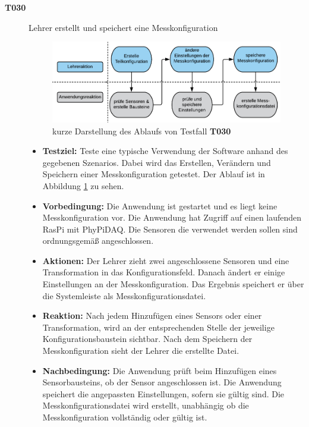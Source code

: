 \documentclass[parskip=full]{scrartcl}
\begin{document}
\begin{description}
\begin{itemize}
\end{itemize}



\item[\textbf{T030}] Lehrer erstellt und speichert eine Messkonfiguration

\begin{figure}[htbp]
	\begin{center}
		\includegraphics[width = 13cm]{Grafik/T030-Ablauf.png}
		\caption{kurze Darstellung des Ablaufs von Testfall \textbf{T030}}
		\label{T030-Ablauf}
	\end{center}
\end{figure}




\begin{itemize}

\item []\textbf{Testziel:} Teste eine typische Verwendung der Software anhand des gegebenen Szenarios. Dabei wird das Erstellen, Verändern und Speichern einer Messkonfiguration getestet. Der Ablauf ist in Abbildung \ref{T030-Ablauf} zu sehen.

\item []\textbf{Vorbedingung:} Die Anwendung ist gestartet und es liegt keine Messkonfiguration vor. Die Anwendung hat Zugriff auf einen laufenden \gls{RasPi} mit \gls{PhyPiDAQ}. Die Sensoren die verwendet werden sollen sind ordnungsgemäß angeschlossen.
\item []\textbf{Aktionen:} Der Lehrer zieht zwei angeschlossene Sensoren und eine Transformation in das Konfigurationsfeld. Danach ändert er einige Einstellungen an der Messkonfiguration. Das Ergebnis speichert er über die Systemleiste als Messkonfigurationsdatei.
\item []\textbf{Reaktion:} Nach jedem Hinzufügen eines Sensors oder einer Transformation, wird an der entsprechenden Stelle der jeweilige Konfigurationsbaustein sichtbar. Nach dem Speichern der Messkonfiguration sieht der Lehrer die erstellte Datei.
\item []\textbf{Nachbedingung:} Die Anwendung prüft beim Hinzufügen eines Sensorbausteins, ob der Sensor angeschlossen ist. Die Anwendung speichert die angepassten Einstellungen, sofern sie gültig sind. Die Messkonfigurationsdatei wird erstellt, unabhängig ob die Messkonfiguration vollständig oder gültig ist.


\end{itemize}
\end{description}
\end{document}
